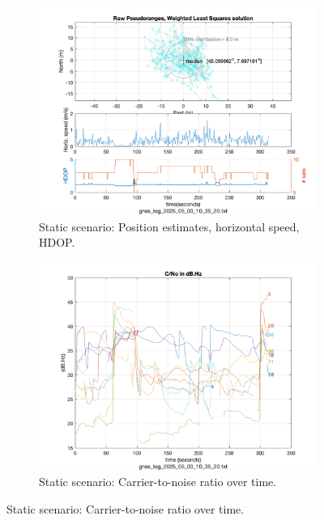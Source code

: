             \begin{figure}[h!]
                \centering
                \begin{subfigure}{0.23\textwidth}
                    \centering
                    \includegraphics[width=\textwidth]{images/Monte_Cappuccini/filtered/Samsung_A51_Monte_Cappuccini_fig4.png}
                    \caption{Static scenario: Position estimates, horizontal speed, HDOP.}
                    \label{fig:static_pos}
                \end{subfigure}
                \hfill
                \begin{subfigure}{0.23\textwidth}
                    \centering
                    \includegraphics[width=\textwidth]{images/Monte_Cappuccini/filtered/Samsung_A51_Monte_Cappuccini_fig3.png}
                    \caption{Static scenario: Carrier-to-noise ratio over time.}
                    \label{fig:static_cno}
                \end{subfigure}
                \vspace{0.35cm}
                \label{fig:gnss_comparison}
            \end{figure}

